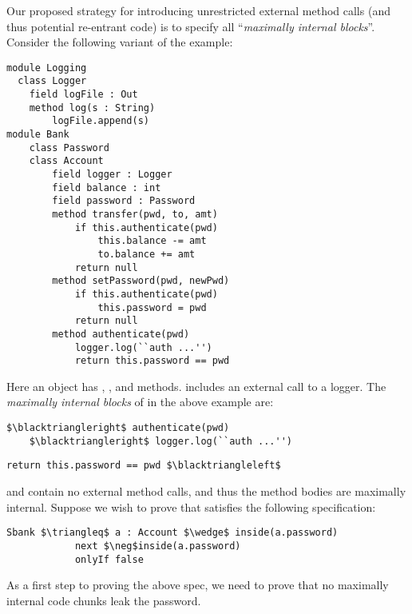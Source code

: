 \documentclass[11pt]{article} %
\theoremstyle{definition}
\begin{document}
Our proposed strategy for introducing unrestricted external method calls (and thus potential re-entrant code)
is to specify all ``\emph{maximally internal blocks}''. Consider the following variant of the 
example:
\begin{lstlisting}[language = Chainmail, mathescape=true, frame=lines]
module Logging
  class Logger
  	field logFile : Out
  	method log(s : String)
  		logFile.append(s)
module Bank
	class Password
	class Account
		field logger : Logger
		field balance : int
		field password : Password
		method transfer(pwd, to, amt)
			if this.authenticate(pwd)
				this.balance -= amt
				to.balance += amt
			return null
		method setPassword(pwd, newPwd)
			if this.authenticate(pwd)
				this.password = pwd
			return null
		method authenticate(pwd)
			logger.log(``auth ...'')
			return this.password == pwd
\end{lstlisting}
Here an  object has , , and  methods.
 includes an external call to a logger.
The \emph{maximally internal blocks} of  in the above example are:
\begin{lstlisting}[language = Chainmail, frame = lines, mathescape = true]
$\blacktriangleright$ authenticate(pwd)
	$\blacktriangleright$ logger.log(``auth ...'')
\end{lstlisting}
\begin{lstlisting}[language = Chainmail, frame = lines, mathescape]
return this.password == pwd $\blacktriangleleft$
\end{lstlisting}
 and  contain no external method calls, and thus the method bodies are maximally internal.
Suppose we wish to prove that  satisfies the following specification:
\begin{lstlisting}[language = Chainmail, frame = lines, mathescape = true]
Sbank $\triangleq$ a : Account $\wedge$ inside(a.password)
			next $\neg$inside(a.password)
			onlyIf false
\end{lstlisting}
As a first step to proving the above spec, we need to prove that no maximally internal code chunks leak the password.
\end{document}
